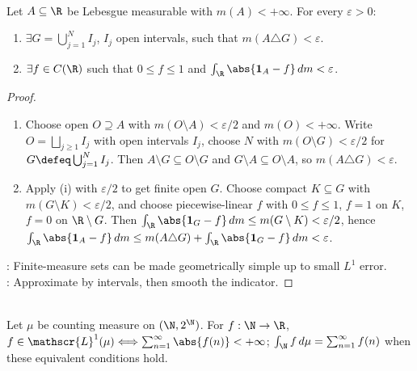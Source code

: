 \begin{proposition} \label{prop:finite-measure-indicator-continuous-l1-approximation} \\
Let $A\subseteq\R$ be Lebesgue measurable with $m(A)<+\infty$. For every $\varepsilon>0$:
\begin{enumerate}[label=(\roman*)]
\setlength{\itemsep}{0pt}
\item $\exists G=\bigcup_{j=1}^{N}I_j$, $I_j$ open intervals, such that $m(A\triangle G)<\varepsilon$.
\item $\exists f\in C(\R)$ such that $0\leq f\leq1$ and $\int_{\R}\abs{\mathbf{1}_A-f}\,dm<\varepsilon$.
\end{enumerate}
\begin{proof}
\begin{enumerate}[label=(\roman*)]
\setlength{\itemsep}{0pt}
\item Choose open $O\supseteq A$ with $m(O\setminus A)<\varepsilon/2$ and $m(O)<+\infty$. Write $O=\bigsqcup_{j\geq1}I_j$ with open intervals $I_j$, choose $N$ with $m(O\setminus G)<\varepsilon/2$ for $G\defeq\bigcup_{j=1}^{N}I_j$. Then $A\setminus G\subseteq O\setminus G$ and $G\setminus A\subseteq O\setminus A$, so $m(A\triangle G)<\varepsilon$.
\item Apply (i) with $\varepsilon/2$ to get finite open $G$. Choose compact $K\subseteq G$ with $m(G\setminus K)<\varepsilon/2$, and choose piecewise-linear $f$ with $0\leq f\leq1$, $f=1$ on $K$, $f=0$ on $\R\setminus G$. Then $\int_{\R}\abs{\mathbf{1}_G-f}\,dm\leq m(G\setminus K)<\varepsilon/2$, hence $\int_{\R}\abs{\mathbf{1}_A-f}\,dm\leq m(A\triangle G)+\int_{\R}\abs{\mathbf{1}_G-f}\,dm<\varepsilon$.
\end{enumerate}
: Finite-measure sets can be made geometrically simple up to small $L^1$ error.\\
: Approximate by intervals, then smooth the indicator.
\end{proof}
\end{proposition}

\begin{example} \label{ex:counting-measure-l1-absolute-series} \\
Let $\mu$ be counting measure on $(\N,2^\N)$. For $f:\N\to\R$,\\
$f\in\mathscr{L}^1(\mu)\Longleftrightarrow\sum_{n=1}^{\infty}\abs{f(n)}<+\infty$; $\int_{\N}f\,d\mu=\sum_{n=1}^{\infty}f(n)$ when these equivalent conditions hold.
\end{example}

